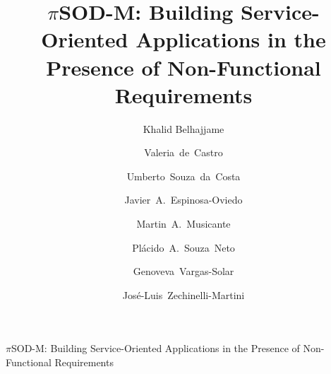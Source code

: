 \documentclass{ws-ijseke}
\newcommand{\pisodm}[0]{$\pi$SOD-M\xspace}
\begin{document}
{\pisodm: Building Service-Oriented Applications in the Presence of Non-Functional Requirements}

%
\catchline{}{}{}{}{}
%

\title{\pisodm: Building Service-Oriented Applications in the Presence of Non-Functional Requirements}

\author{Khalid Belhajjame}
\address{Universit\'e de Paris - Dauphine -- Paris, France\\
}

\author{Valeria~de~Castro} 
\address{Universidad Rey Juan Carlos -- M\'{o}stoles, Spain\\
}

\author{Umberto~Souza~da~Costa} 
\address{Universidade Federal do Rio Grande do Norte -- Natal, Brazil\\
}

\author{Javier~A.~Espinosa-Oviedo} 
\address{Universidad de las Am\'ericas-Puebla, LAFMIA -- Cholula, Mexico\\
}

\author{Martin~A.~Musicante} 
\address{Universidade Federal do Rio Grande do Norte -- Natal, Brazil\\
}

\author{Pl\'acido~A.~Souza~Neto} 
\address{Instituto Federal de Educa\c{c}\~{a}o, Ci\^{e}ncia e Tecnologia do Rio Grande do Norte -- Natal, Brazil\\
}

\author{Genoveva~Vargas-Solar} 
\address{CNRS, LIG-LAFMIA, Saint Martin d'H\`eres, France\\
}

\author{Jos\'e-Luis~Zechinelli-Martini}
\address{Universidad de las Am\'ericas-Puebla, LAFMIA -- Cholula, Mexico\\
}

\maketitle

\begin{history}
\end{history}
\end{document}

